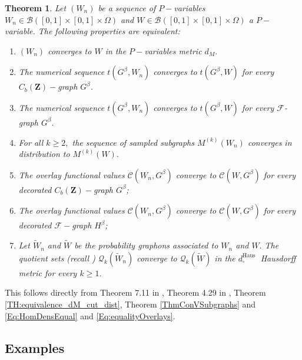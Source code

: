 \documentclass[11pt]{article}
\newtheorem{theorem}{Theorem}[section]
\newcommand{\cB}{{\mathcal B}}  %
\newcommand{\cF}{{\mathcal F}}  %
\newcommand{\Space}{\mathbf{Z}}
\newcommand{\CbFunct}{C_b(\Space)}
\begin{document}
\begin{theorem}
Let $(W_n)$ be a sequence of $P-$variables $W_n\in \cB([0,1]\times [0,1]\times \Omega)$ and $W\in \cB([0,1]\times [0,1]\times \Omega)$ a $P-$variable. The following properties are equivalent:
\begin{enumerate}
\item $(W_n)$ converges to $W$ in the $P-$variables metric $d_M.$ 
\item The numerical sequence $t(G^{\beta},W_n)$ converges to $t(G^{\beta},W)$ for every $\CbFunct-$graph $G^{\beta}$.
\item The numerical sequence $t(G^{\beta},W_n)$ converges to $t(G^{\beta},W)$ for every $\cF$-graph $G^{\beta}$.
\item For all $k\geq 2,$ the sequence of sampled subgraphs $M^{(k)}(W_n)$ converges in distribution to $M^{(k)}(W).$
\item The overlay functional values $\mathcal{C}\left(W_n, G^{\beta}\right)$ converge to $\mathcal{C}\left(W, G^{\beta}\right)$ for every decorated $\CbFunct-$graph $G^{\beta}$;
\item The overlay functional values $\mathcal{C}\left(W_n, G^{\beta}\right)$ converge to $\mathcal{C}\left(W, G^{\beta}\right)$ for every decorated $\cF-$graph $H^{\beta}$;
\item  Let $\widetilde W_n$ and $\widetilde W$ be the probability graphons associated to $W_n$ and $W. $ The quotient sets (recall ) $\mathcal{Q}_k\left(\widetilde W_n\right)$ converge to $\mathcal{Q}_k\left(\widetilde W\right)$ in the $d_{\square}^{\text {Haus }}$ Hausdorff metric for every $k \geq 1$.
\end{enumerate}   
\end{theorem}

\proof 
This follows directly from Theorem 7.11 in \cite{abraham2023probabilitygraphons}, Theorem 4.29 in \cite{zucal2024probabilitygraphonsrightconvergence}, Theorem \ref{TH:equivalence_dM_cut_dist}, Theorem \ref{ThmConVSubgraphs} and \eqref{Eq:HomDensEqual} and \eqref{Eq:equalityOverlays}.
\endproof

\subsection{Examples}
\end{document}
